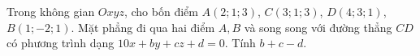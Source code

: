 \begin{ex}
Trong không gian $Oxyz$, cho bốn điểm $A(2;1;3)$, $C(3;1;3)$, $D(4;3;1)$, $B(1;-2;1)$. Mặt phẳng đi qua hai điểm $A,B$ và song song với đường thẳng $CD$ có phương trình dạng $10x+by+cz+d=0$. Tính $b+c-d$.
\end{ex}
